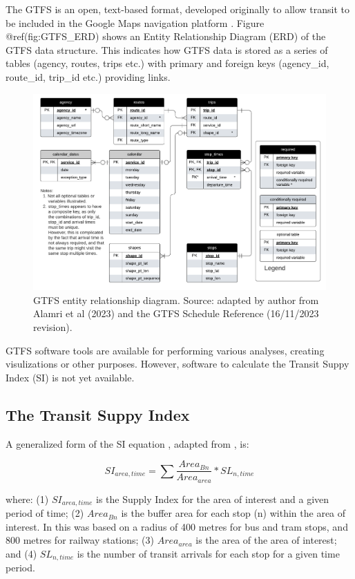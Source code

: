 \documentclass[preprint, 3p,
authoryear]{elsarticle} %
\begin{document}
The GTFS is an open, text-based format, developed originally to allow
transit to be included in the Google Maps navigation platform
\citep{GTFS}. Figure @ref(fig:GTFS\_ERD) shows an Entity Relationship
Diagram (ERD) of the GTFS data structure. This indicates how GTFS data
is stored as a series of tables (agency, routes, trips etc.) with
primary and foreign keys (agency\_id, route\_id, trip\_id etc.)
providing links.

\begin{figure}
\includegraphics[width=1\linewidth]{graphics/GTFS} \caption{GTFS entity relationship diagram. Source: adapted by author from Alamri et al (2023) and the GTFS Schedule Reference (16/11/2023 revision).}\label{fig:GTFS_ERD}
\end{figure}

GTFS software tools are available for performing various analyses,
creating visulizations or other purposes. However, software to calculate
the Transit Suppy Index (SI) is not yet available.

\hypertarget{the-transit-suppy-index}{%
\subsection{The Transit Suppy Index}\label{the-transit-suppy-index}}

A generalized form of the SI equation , adapted from
\citet{currie2010identifying}, is:

\[SI_{area, time} = \sum{\frac{Area_{Bn}}{Area_{area}}*SL_{n, time}}\]

where: (1) \(SI_{area, time}\) is the Supply Index for the area of
interest and a given period of time; (2) \(Area_{Bn}\) is the buffer
area for each stop (n) within the area of interest. In
\citet{currie2010identifying} this was based on a radius of 400 metres
for bus and tram stops, and 800 metres for railway stations; (3)
\(Area_{area}\) is the area of the area of interest; and (4)
\(SL_{n,time}\) is the number of transit arrivals for each stop for a
given time period.
\end{document}
